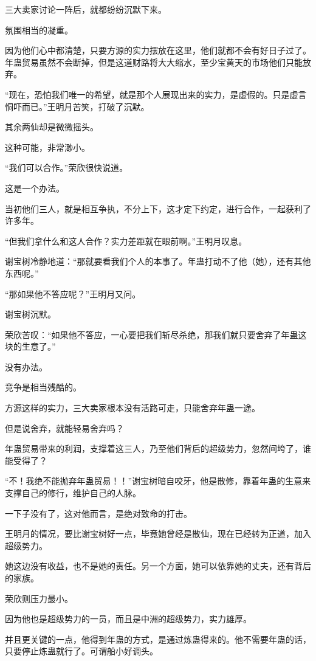 \begin{this_body}
三大卖家讨论一阵后，就都纷纷沉默下来。

氛围相当的凝重。

因为他们心中都清楚，只要方源的实力摆放在这里，他们就都不会有好日子过了。年蛊贸易虽然不会断掉，但是这道财路将大大缩水，至少宝黄天的市场他们只能放弃。

“现在，恐怕我们唯一的希望，就是那个人展现出来的实力，是虚假的。只是虚言恫吓而已。”王明月苦笑，打破了沉默。

其余两仙却是微微摇头。

这种可能，非常渺小。

“我们可以合作。”荣欣很快说道。

这是一个办法。

当初他们三人，就是相互争执，不分上下，这才定下约定，进行合作，一起获利了许多年。

“但我们拿什么和这人合作？实力差距就在眼前啊。”王明月叹息。

谢宝树冷静地道：“那就要看我们个人的本事了。年蛊打动不了他（她），还有其他东西呢。”

“那如果他不答应呢？”王明月又问。

谢宝树沉默。

荣欣苦叹：“如果他不答应，一心要把我们斩尽杀绝，那我们就只要舍弃了年蛊这块的生意了。”

没有办法。

竞争是相当残酷的。

方源这样的实力，三大卖家根本没有活路可走，只能舍弃年蛊一途。

但是说舍弃，就能轻易舍弃吗？

年蛊贸易带来的利润，支撑着这三人，乃至他们背后的超级势力，忽然间垮了，谁能受得了？

“不！我绝不能抛弃年蛊贸易！！”谢宝树暗自咬牙，他是散修，靠着年蛊的生意来支撑自己的修行，维护自己的人脉。

一下子没有了，这对他而言，是绝对致命的打击。

王明月的情况，要比谢宝树好一点，毕竟她曾经是散仙，现在已经转为正道，加入超级势力。

她这边没有收益，也不是她的责任。另一个方面，她可以依靠她的丈夫，还有背后的家族。

荣欣则压力最小。

因为他也是超级势力的一员，而且是中洲的超级势力，实力雄厚。

并且更关键的一点，他得到年蛊的方式，是通过炼蛊得来的。他不需要年蛊的话，只要停止炼蛊就行了。可谓船小好调头。


\end{this_body}
